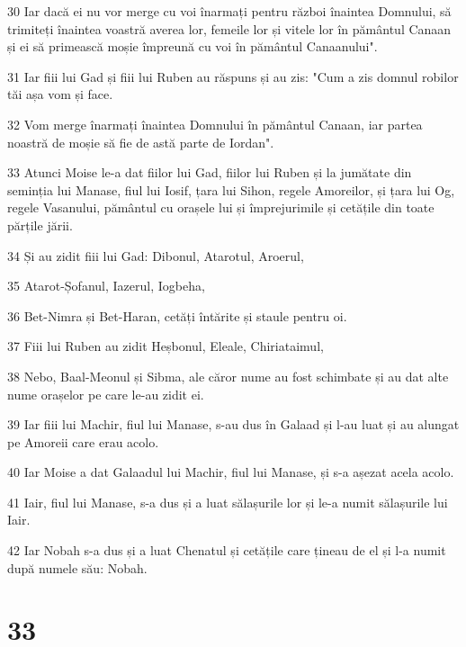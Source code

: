 \par 30 Iar dacă ei nu vor merge cu voi înarmați pentru război înaintea Domnului, să trimiteți înaintea voastră averea lor, femeile lor și vitele lor în pământul Canaan și ei să primească moșie împreună cu voi în pământul Canaanului".
\par 31 Iar fiii lui Gad și fiii lui Ruben au răspuns și au zis: "Cum a zis domnul robilor tăi așa vom și face.
\par 32 Vom merge înarmați înaintea Domnului în pământul Canaan, iar partea noastră de moșie să fie de astă parte de Iordan".
\par 33 Atunci Moise le-a dat fiilor lui Gad, fiilor lui Ruben și la jumătate din seminția lui Manase, fiul lui Iosif, țara lui Sihon, regele Amoreilor, și țara lui Og, regele Vasanului, pământul cu orașele lui și împrejurimile și cetățile din toate părțile jării.
\par 34 Și au zidit fiii lui Gad: Dibonul, Atarotul, Aroerul,
\par 35 Atarot-Șofanul, Iazerul, Iogbeha,
\par 36 Bet-Nimra și Bet-Haran, cetăți întărite și staule pentru oi.
\par 37 Fiii lui Ruben au zidit Heșbonul, Eleale, Chiriataimul,
\par 38 Nebo, Baal-Meonul și Sibma, ale căror nume au fost schimbate și au dat alte nume orașelor pe care le-au zidit ei.
\par 39 Iar fiii lui Machir, fiul lui Manase, s-au dus în Galaad și l-au luat și au alungat pe Amoreii care erau acolo.
\par 40 Iar Moise a dat Galaadul lui Machir, fiul lui Manase, și s-a așezat acela acolo.
\par 41 Iair, fiul lui Manase, s-a dus și a luat sălașurile lor și le-a numit sălașurile lui Iair.
\par 42 Iar Nobah s-a dus și a luat Chenatul și cetățile care țineau de el și l-a numit după numele său: Nobah.

\chapter{33}

